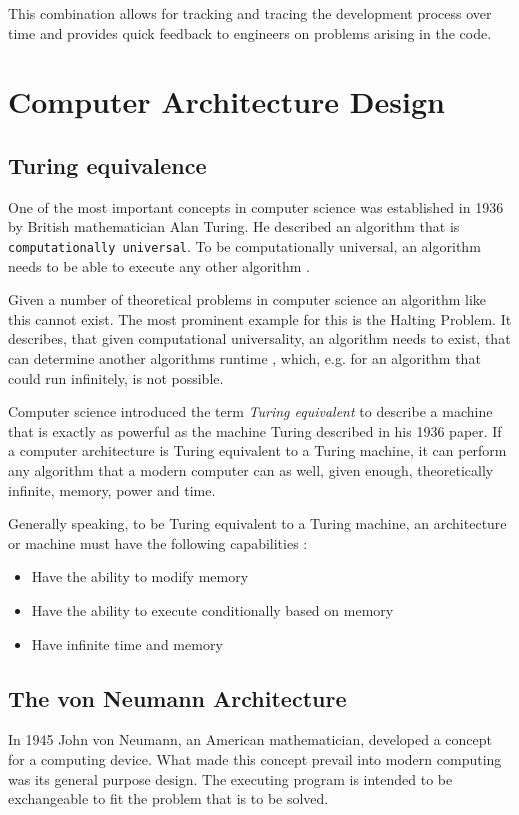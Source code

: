 This combination allows for tracking and tracing the development process over time and provides quick feedback to engineers on problems arising in the code.

\section{Computer Architecture Design}

\subsection{Turing equivalence}
One of the most important concepts in computer science was established in 1936 by British mathematician Alan Turing. He described an algorithm that is \texttt{computationally universal}. To be computationally universal, an algorithm needs to be able to execute any other algorithm \cite{britannicaturing}.

Given a number of theoretical problems in computer science an algorithm like this cannot exist. The most prominent example for this is the Halting Problem. It describes, that given computational universality, an algorithm needs to exist, that can determine another algorithms runtime \cite{haltingproblem}, which, e.g. for an algorithm that could run infinitely, is not possible.

Computer science introduced the term \textit{Turing equivalent} to describe a machine that is exactly as powerful as the machine Turing described in his 1936 paper. If a computer architecture is Turing equivalent to a Turing machine, it can perform any algorithm that a modern computer can as well, given enough, theoretically infinite, memory, power and time.

Generally speaking, to be Turing equivalent to a Turing machine, an architecture or machine must have the following capabilities \cite{beneaterturing}:
\begin{itemize}
  \item Have the ability to modify memory
  \item Have the ability to execute conditionally based on memory
  \item Have infinite time and memory
\end{itemize}


\subsection{The von Neumann Architecture} \label{subsec:vna}
In 1945 John von Neumann, an American mathematician, developed a concept for a computing device. What made this concept prevail into modern computing was its general purpose design. The executing program is intended to be exchangeable to fit the problem that is to be solved.

